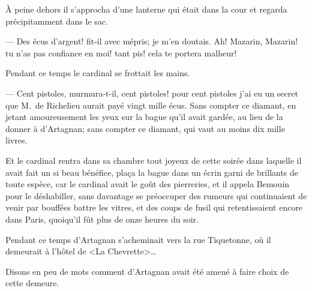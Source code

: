 À peine dehors il s'approcha d'une lanterne qui était dans la cour et regarda précipitamment dans le sac.

— Des écus d'argent! fit-il avec mépris; je m'en doutais. Ah! Mazarin, Mazarin! tu n'as pas confiance en moi! tant pis! cela te portera malheur!

Pendant ce temps le cardinal se frottait les mains.

— Cent pistoles, murmura-t-il, cent pistoles! pour cent pistoles j'ai eu un secret que M.~de Richelieu aurait payé vingt mille écus. Sans compter ce diamant, en jetant amoureusement les yeux sur la bague qu'il avait gardée, au lieu de la donner à d'Artagnan; sans compter ce diamant, qui vaut au moins dix mille livres.

Et le cardinal rentra dans sa chambre tout joyeux de cette soirée dans laquelle il avait fait un si beau bénéfice, plaça la bague dans un écrin garni de brillants de toute espèce, car le cardinal avait le goût des pierreries, et il appela Bemouin pour le déshabiller, sans davantage se préoccuper des rumeurs qui continuaient de venir par bouffées battre les vitres, et des coups de fusil qui retentissaient encore dans Paris, quoiqu'il fût plus de onze heures du soir.

Pendant ce temps d'Artagnan s'acheminait vers la rue Tiquetonne, où il demeurait à l'hôtel de <La Chevrette>\dots

Disons en peu de mots comment d'Artagnan avait été amené à faire choix de cette demeure.